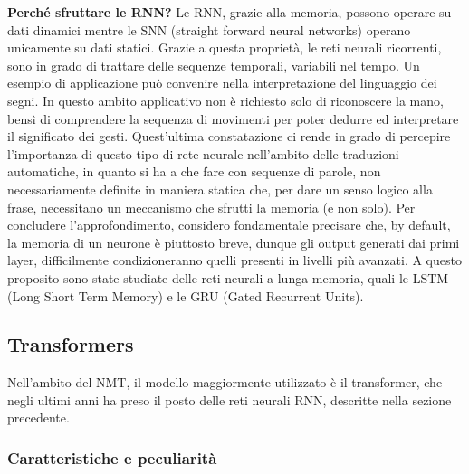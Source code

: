 \textbf{Perché sfruttare le RNN?}
Le RNN, grazie alla memoria, possono operare su dati dinamici mentre le SNN (straight forward neural networks) operano unicamente su dati statici. Grazie a questa proprietà, le reti neurali ricorrenti, sono in grado di trattare delle sequenze temporali, variabili nel tempo. Un esempio di applicazione può convenire nella interpretazione del linguaggio dei segni. In questo ambito applicativo non è richiesto solo di riconoscere la mano, bensì di comprendere la sequenza di movimenti per poter dedurre ed interpretare il significato dei gesti. Quest'ultima constatazione ci rende in grado di percepire l'importanza di questo tipo di rete neurale nell'ambito delle traduzioni automatiche, in quanto si ha a che fare con sequenze di parole, non necessariamente definite in maniera statica che, per dare un senso logico alla frase, necessitano un meccanismo che sfrutti la memoria (e non solo). Per concludere l'approfondimento, considero fondamentale precisare che, by default, la memoria di un neurone è piuttosto breve, dunque gli output generati dai primi layer, difficilmente condizioneranno quelli presenti in livelli più avanzati. A questo proposito sono state studiate delle reti neurali a lunga memoria, quali le 
LSTM (Long Short Term Memory) e le GRU (Gated Recurrent Units).

\subsection{Transformers}

Nell'ambito del NMT, il modello maggiormente utilizzato è il transformer, che negli ultimi anni ha preso il posto delle reti neurali RNN, descritte nella sezione precedente. 

\subsubsection{Caratteristiche e peculiarità}

